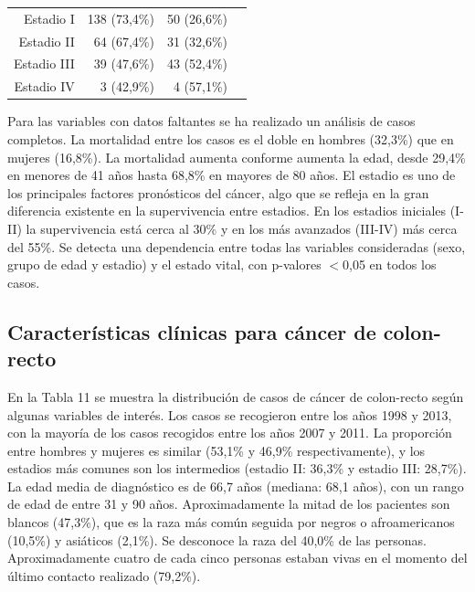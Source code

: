\begin{table}[H]
\begin{tabular}{rrrc}
		Estadio I                                      & 138 (73,4\%)              & 50 (26,6\%)                 &                                          \\
		Estadio II                                     & 64 (67,4\%)               & 31 (32,6\%)                 &                                          \\
		Estadio III                                    & 39 (47,6\%)               & 43 (52,4\%)                 &                                          \\
		Estadio IV                                     & 3 (42,9\%)                & 4 (57,1\%)                  &                                          \\ \hline
	\end{tabular}
\end{table}

Para las variables con datos faltantes se ha realizado un análisis de casos completos.  La mortalidad entre los casos es el doble en hombres (32,3\%) que en mujeres (16,8\%). La mortalidad aumenta conforme aumenta la edad, desde 29,4\% en menores de 41 años hasta 68,8\% en mayores de 80 años. El estadio es uno de los principales factores pronósticos del cáncer, algo que se refleja en la gran diferencia existente en la supervivencia entre estadios. En los estadios iniciales (I-II) la supervivencia está cerca al 30\% y en los más avanzados (III-IV) más cerca del 55\%. Se detecta una dependencia entre todas las variables consideradas (sexo, grupo de edad y estadio)  y el estado vital, con p-valores $<$0,05 en todos los casos.

\subsection{Características clínicas para cáncer de colon-recto}

En la Tabla 11 se muestra  la distribución de casos de cáncer de colon-recto según algunas variables de interés. Los casos se recogieron entre los años 1998 y 2013, con la mayoría de los casos recogidos entre los años 2007 y 2011. La proporción entre hombres y mujeres es similar (53,1\% y 46,9\% respectivamente), y los estadios más comunes son los intermedios (estadio II: 36,3\% y estadio III: 28,7\%). La edad media de diagnóstico es de 66,7 años (mediana: 68,1 años), con un rango de edad de entre 31 y 90 años. Aproximadamente la mitad de los pacientes son blancos (47,3\%), que es la raza más común seguida por negros o afroamericanos (10,5\%) y asiáticos (2,1\%). Se desconoce la raza del 40,0\% de las personas. Aproximadamente cuatro de cada cinco personas estaban vivas en el momento del último contacto realizado (79,2\%).\\

